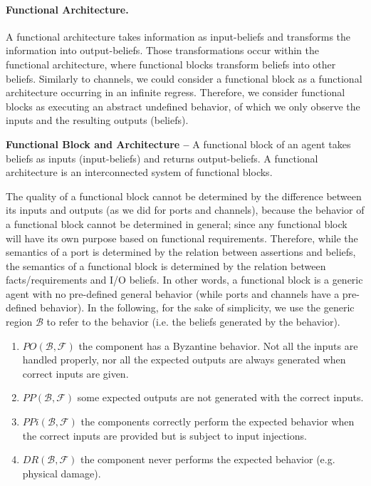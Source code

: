 \documentclass[runningheads]{llncs}
\newcommand{\beliefRegion}{\mathcal{B}}
\newcommand{\factRegion}{\mathcal{F}}
\newcommand{\pp}[2]{PP(#1,#2)}
\newcommand{\po}[2]{PO(#1,#2)}
\newcommand{\ppi}[2]{PPi(#1,#2)}
\newcommand{\dr}[2]{DR(#1,#2)}
\begin{document}
\paragraph{Functional Architecture.}
A functional architecture takes information as input-beliefs and transforms the
information into output-beliefs. Those transformations occur within the
functional architecture, where functional blocks transform beliefs into other
beliefs. Similarly to channels, we could consider a functional block as a
functional architecture occurring in an infinite regress. Therefore, we
consider functional blocks as executing an abstract undefined behavior, of
which we only observe the inputs and the resulting outputs (beliefs).

\begin{definition}{\bf Functional Block and Architecture --}\label{def:funblock}
	A functional block of an agent takes beliefs as  inputs (input-beliefs) and
	returns output-beliefs.  A functional architecture is an
	interconnected system of functional blocks.
\end{definition}
The quality of a functional block cannot be determined
by the difference between its inputs and outputs (as we did for
ports and channels), because the behavior of a functional block
cannot be determined in general; since any functional block will have 
its own purpose based on functional requirements. 
Therefore, while the semantics of a port is determined by the relation 
between assertions and beliefs, the semantics of a functional block 
is determined by the relation between facts/requirements and I/O beliefs.
In other words, a functional block is a generic agent with no pre-defined general
behavior (while ports and channels have a pre-defined behavior).
In the following, for the sake of simplicity, 
we use the generic region $\beliefRegion$ to refer to the behavior (i.e.
the beliefs generated by the behavior).

\begin{enumerate}[start=50, label={W\arabic*)}]
	\item $\po{\beliefRegion}{\factRegion}$ the component has a Byzantine
		behavior. Not all the inputs are handled properly,
		nor all the expected outputs are always generated when correct
		inputs are given.
	\item $\pp{\beliefRegion}{\factRegion}$ some expected outputs are not
	        generated with the correct
	        inputs.
	\item $\ppi{\beliefRegion}{\factRegion}$ the components
	        correctly perform the expected behavior when the correct
	        inputs are provided but is subject to input
	        injections.
	\item $\dr{\beliefRegion}{\factRegion}$ the component
		never performs the expected behavior (e.g. physical
		damage).
\end{enumerate}
\end{document}
